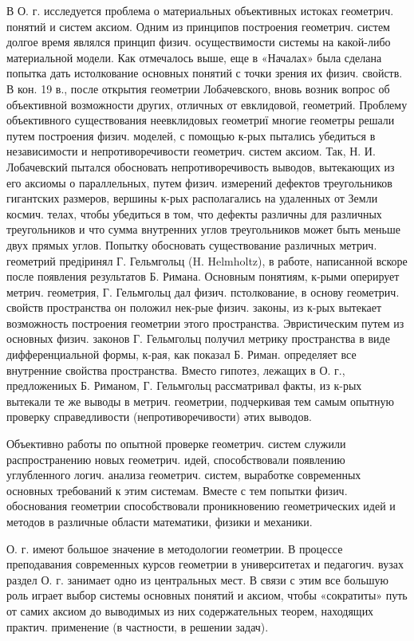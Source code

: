 \documentclass[10pt]{article}
\begin{document}
В О. г. исследуется проблема о материальных объективных истоках геометрич. понятий и систем аксиом. Одним из принципов построения геометрич. систем долгое время являлся принцип физич. осуществимости системы на какой-либо материальной модели. Как отмечалось выше, еще в «Началах» была сделана попытка дать истолкование основных понятий с точки зрения их физич. свойств. В кон. 19 в., после открытия геометрии Лобачевского, вновь возник вопрос об объективной возможности других, отличных от евклидовой, геометрий. Проблему объективного существования неевклидовых геометриї многие геометры решали путем построения физич. моделей, с помощью к-рых пытались убедиться в независимости и непротиворечивости геометрич. систем аксиом. Так, Н. И. Лобачевский пытался обосновать непротиворечивость выводов, вытекающих из его аксиомы о параллельных, путем физич. измерений дефектов треугольников гигантских размеров, вершины к-рых располагались на удаленных от Земли космич. телах, чтобы убедиться в том, что дефекты различны для различных треугольников и что сумма внутренних углов треугольников может быть меньше двух прямых углов. Попытку обосновать существование различных метрич. геометрий предіринял Г. Гельмгольц (H. Helmholtz), в работе, написанной вскоре после появления результатов Б. Римана. Основным понятиям, к-рыми оперирует метрич. геометрия, Г. Гельмгольц дал физич. пстолкование, в основу геометрич. свойств пространства он положил нек-рые физич. законы, из к-рых вытекает возможность построения геометрии этого пространства. Эвристическим путем из основных физич. законов Г. Гельмгольц получил метрику пространства в виде дифференциальной формы, к-рая, как показал Б. Риман. определяет все внутренние свойства пространства. Вместо гипотез, лежащих в О. г., предложениых Б. Риманом, Г. Гельмгольц рассматривал факты, из к-рых вытекали те же выводы в метрич. геометрии, подчеркивая тем самым опытную проверку справедливости (непротиворечивости) әтих выводов.



Объективно работы по опытной проверке геометрич. систем служили распространению новых геометрич. идей, способствовали появлению углубленного логич. анализа геометрич. систем, выработке современных основных требований к этим системам. Вместе с тем попытки физич. обоснования геометрии способствовали проникновению геометрических идей и методов в различные области математики, физики и механики.



О. г. имеют большое значение в методологии геометрии. В процессе преподавания современных курсов геометрии в университетах и педагогич. вузах раздел О. г. занимает одно из центральных мест. В связи с этим все большую роль играет выбор системы основных понятий и аксиом, чтобы «сократиты» путь от самих аксиом до выводимых из них содержательных теорем, находящих практич. применение (в частности, в решении задач).
\end{document}
